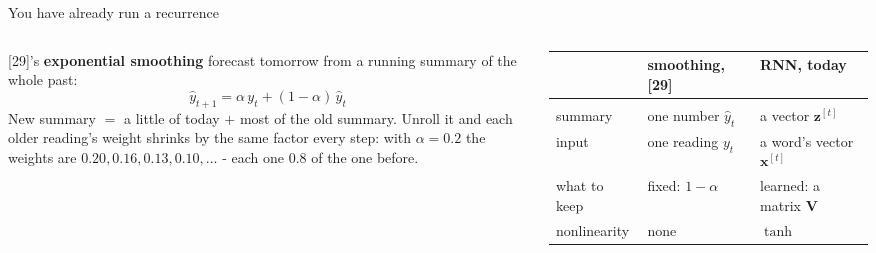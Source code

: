 \documentclass[aspectratio=169]{beamer}
\begin{document}
\begin{frame}{You have already run a recurrence}
  \begin{columns}[T]
    \small
    [29]'s \textbf{exponential smoothing} forecast tomorrow from a running summary of the
    whole past:
    \[
      \hat{y}_{t+1} = \alpha\, y_t + (1-\alpha)\,\hat{y}_t
    \]
    New summary $=$ a little of today $+$ most of the old summary. Unroll it and each older
    reading's weight shrinks by the same factor every step: with $\alpha = 0.2$ the weights
    are $0.20, 0.16, 0.13, 0.10, \dots$ - each one $0.8$ of the one before.
    \vskip 2pt
    \footnotesize
    \begin{tabular}{@{}lll@{}}
      & \textbf{smoothing, [29]} & \textbf{RNN, today} \\[2pt]
      \hline\\[-8pt]
      summary & one number $\hat{y}_t$ & a vector $\mathbf{z}^{[t]}$ \\[3pt]
      input & one reading $y_t$ & a word's vector $\mathbf{x}^{[t]}$ \\[3pt]
      what to keep & fixed: $1-\alpha$ & learned: a matrix $\mathbf{V}$ \\[3pt]
      nonlinearity & none & $\tanh$ \\
    \end{tabular}
    \vskip 10pt
  \end{columns}
\end{frame}
\end{document}
